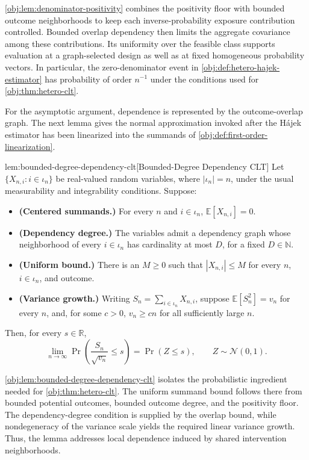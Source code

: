 \cref{obj:lem:denominator-positivity} combines the positivity floor with bounded outcome neighborhoods to keep each inverse-probability exposure contribution controlled. Bounded overlap dependency then limits the aggregate covariance among these contributions. Its uniformity over the feasible class supports evaluation at a graph-selected design as well as at fixed homogeneous probability vectors. In particular, the zero-denominator event in \cref{obj:def:hetero-hajek-estimator} has probability of order \(n^{-1}\) under the conditions used for \cref{obj:thm:hetero-clt}.

For the asymptotic argument, dependence is represented by the outcome-overlap graph. The next lemma gives the normal approximation invoked after the Hájek estimator has been linearized into the summands of \cref{obj:def:first-order-linearization}.

\begin{lemmav}{lem:bounded-degree-dependency-clt}[Bounded-Degree Dependency CLT]
Let \(\{X_{n,i}: i\in\iota_n\}\) be real-valued random variables, where \(|\iota_n|=n\), under the usual measurability and integrability conditions. Suppose:
\begin{itemize}
\item \textbf{(Centered summands.)} For every \(n\) and \(i\in\iota_n\), \(\mathbb E[X_{n,i}]=0\).
\item \textbf{(Dependency degree.)} The variables admit a dependency graph whose neighborhood of every \(i\in\iota_n\) has cardinality at most \(D\), for a fixed \(D\in\mathbb N\).
\item \textbf{(Uniform bound.)} There is an \(M\ge 0\) such that \(|X_{n,i}|\le M\) for every \(n\), \(i\in\iota_n\), and outcome.
\item \textbf{(Variance growth.)} Writing \(S_n=\sum_{i\in\iota_n}X_{n,i}\), suppose \(\mathbb E[S_n^2]=v_n\) for every \(n\), and, for some \(c>0\), \(v_n\ge cn\) for all sufficiently large \(n\).
\end{itemize}
Then, for every \(s\in\mathbb R\),
\[
\lim_{n\to\infty}\Pr\!\left(\frac{S_n}{\sqrt{v_n}}\le s\right)
=
\Pr\!\left(Z\le s\right),
\qquad Z\sim\mathcal N(0,1).
\]
\end{lemmav}

\cref{obj:lem:bounded-degree-dependency-clt} isolates the probabilistic ingredient needed for \cref{obj:thm:hetero-clt}. The uniform summand bound follows there from bounded potential outcomes, bounded outcome degree, and the positivity floor. The dependency-degree condition is supplied by the overlap bound, while nondegeneracy of the variance scale yields the required linear variance growth. Thus, the lemma addresses local dependence induced by shared intervention neighborhoods.

